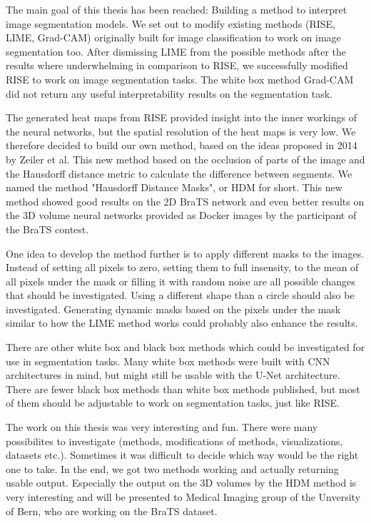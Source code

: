 The main goal of this thesis has been reached: Building a method to interpret image segmentation models. We set out to modify existing methods (RISE, LIME, Grad-CAM) originally built for image classification to work on image segmentation too. After dismissing LIME from the possible methods after the results where underwhelming in comparison to RISE, we successfully modified RISE to work on image segmentation tasks. The white box method Grad-CAM did not return any useful interpretability results on the segmentation task.

The generated heat maps from RISE provided insight into the inner workings of the neural networks, but the spatial resolution of the heat maps is very low. We therefore decided to build our own method, based on the ideas proposed in 2014 by Zeiler et al. This new method based on the occlusion of parts of the image and the Hausdorff distance metric to calculate the difference between segments. We named the method "Hausdorff Distance Masks", or HDM for short. This new method showed good results on the 2D BraTS network and even better results on the 3D volume neural networks provided as Docker images by the participant of the BraTS contest.

One idea to develop the method further is to apply different masks to the images. Instead of setting all pixels to zero, setting them to full insensity, to the mean of all pixels under the mask or filling it with random noise are all possible changes that should be investigated. Using a different shape than a circle should also be investigated. Generating dynamic masks based on the pixels under the mask similar to how the LIME method works could probably also enhance the results.

There are other white box and black box methods which could be investigated for use in segmentation tasks. Many white box methods were built with CNN architectures in mind, but might still be usable with the U-Net architecture. There are fewer black box methods than white box methods published, but most of them should be adjustable to work on segmentation tasks, just like RISE.

The work on this thesis was very interesting and fun. There were many possibilites to investigate (methods, modifications of methods, visualizations, datasets etc.). Sometimes it was difficult to decide which way would be the right one to take. In the end, we got two methods working and actually returning usable output. Especially the output on the 3D volumes by the HDM method is very interesting and will be presented to Medical Imaging group of the Unversity of Bern, who are working on the BraTS dataset.